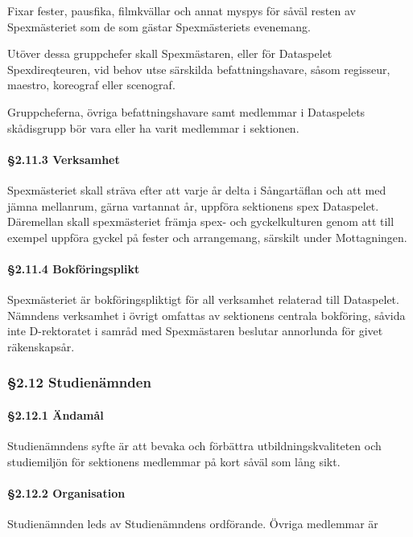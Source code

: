 Fixar fester, pausfika, filmkvällar och annat myspys för såväl resten av Spexmästeriet som de som gästar Spexmästeriets evenemang.

Utöver dessa gruppchefer skall Spexmästaren, eller för Dataspelet Spexdireqteuren, vid behov utse särskilda befattningshavare, såsom regisseur, maestro, koreograf eller scenograf.

Gruppcheferna, övriga befattningshavare samt medlemmar i Dataspelets skådisgrupp bör vara eller ha varit medlemmar i sektionen.

\paragraph{§2.11.3 Verksamhet}

Spexmästeriet skall sträva efter att varje år delta i Sångartäflan och att med jämna mellanrum, gärna vartannat år, uppföra sektionens spex Dataspelet. Däremellan skall spexmästeriet främja spex- och gyckelkulturen genom att till exempel uppföra gyckel på fester och arrangemang, särskilt under Mottagningen.

\paragraph{§2.11.4 Bokföringsplikt}

Spexmästeriet är bokföringspliktigt för all verksamhet relaterad till Dataspelet. Nämndens verksamhet i övrigt omfattas av sektionens centrala bokföring, såvida inte D-rektoratet i samråd med Spexmästaren beslutar annorlunda för givet räkenskapsår.

\subsubsection{§2.12 Studienämnden}

\paragraph{§2.12.1 Ändamål}

Studienämndens syfte är att bevaka och förbättra utbildningskvaliteten och studiemiljön för sektionens medlemmar på kort såväl som lång sikt.

\paragraph{§2.12.2 Organisation}

Studienämnden leds av Studienämndens ordförande. Övriga medlemmar är

